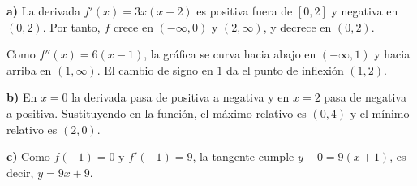 \textbf{a)} La derivada $f'(x)=3x(x-2)$ es positiva fuera de $[0,2]$ y negativa en $(0,2)$. Por tanto, $f$ crece en $(-\infty,0)$ y $(2,\infty)$, y decrece en $(0,2)$.

Como $f''(x)=6(x-1)$, la gráfica se curva hacia abajo en $(-\infty,1)$ y hacia arriba en $(1,\infty)$. El cambio de signo en $1$ da el punto de inflexión $(1,2)$.

\textbf{b)} En $x=0$ la derivada pasa de positiva a negativa y en $x=2$ pasa de negativa a positiva. Sustituyendo en la función, el máximo relativo es $\boxed{(0,4)}$ y el mínimo relativo es $\boxed{(2,0)}$.

\textbf{c)} Como $f(-1)=0$ y $f'(-1)=9$, la tangente cumple $y-0=9(x+1)$, es decir, $\boxed{y=9x+9}$.
